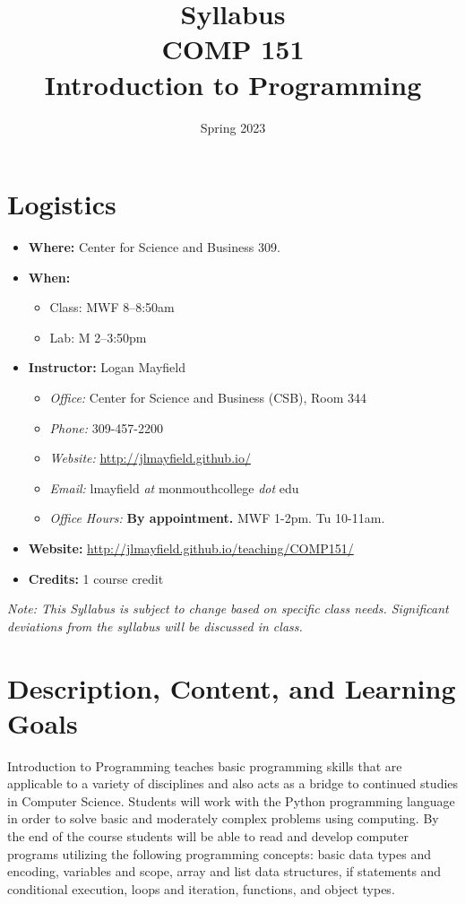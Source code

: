 \documentclass[10pt]{article}
\title{Syllabus \\ COMP 151 \\ Introduction to Programming}
\author{  }
\date{Spring 2023}
\begin{document}
\maketitle

\section{Logistics}
\begin{itemize}
\item \textbf{Where: } Center for Science and Business 309.
\item \textbf{When: }
\begin{itemize}
  \item Class: MWF 8--8:50am
  \item Lab: M 2--3:50pm
\end{itemize}
\item \textbf{Instructor: } Logan Mayfield
\begin{itemize}
\item \textit{Office: } Center for Science and Business (CSB), Room 344
\item \textit{Phone: } 309-457-2200 %
\item \textit{Website: } \url{http://jlmayfield.github.io/}
\item \textit{Email: } lmayfield \textit{at} monmouthcollege \textit{dot} edu
\item \textit{Office Hours: }  \textbf{By appointment.} MWF 1-2pm. Tu 10-11am. 
\end{itemize}
\item \textbf{Website: } \url{http://jlmayfield.github.io/teaching/COMP151/}
\item \textbf{Credits: } 1 course credit
\end{itemize}
\emph{Note: This Syllabus is subject to change based on specific class needs. Significant deviations from the syllabus will be discussed in class.}


\section{Description, Content, and Learning Goals}

Introduction to Programming teaches basic programming skills that are applicable to a variety of disciplines and also acts as a bridge to continued studies in Computer Science. Students will work with the Python programming language in order to solve basic and moderately complex problems using computing. By the end of the course students will be able to read and develop computer programs utilizing the following programming concepts: basic data types and encoding, variables and scope, array and list data structures, if statements and conditional execution, loops and iteration, functions, and object types.
\end{document}
